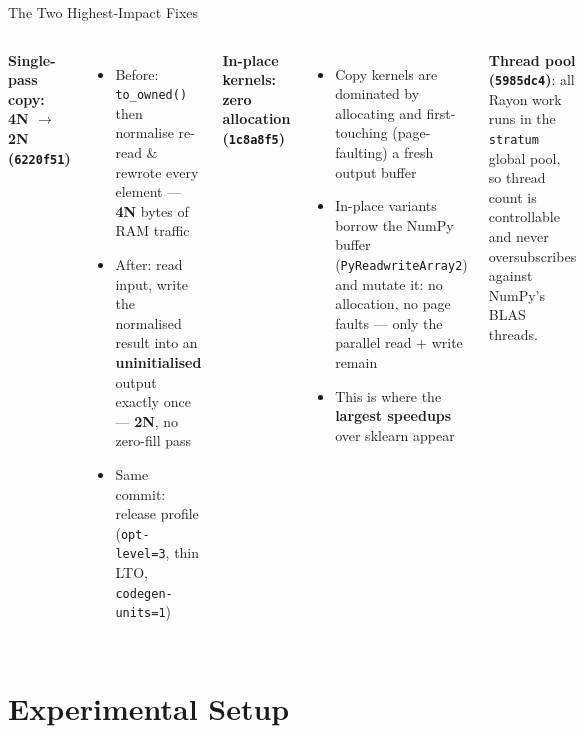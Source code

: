 \documentclass[aspectratio=169]{beamer}
\begin{document}
\begin{frame}{The Two Highest-Impact Fixes}
  \begin{columns}[T]
    \textbf{Single-pass copy: 4N $\rightarrow$ 2N (\texttt{6220f51})}
    \begin{itemize}
      \item Before: \texttt{to\_owned()} then normalise re-read \& rewrote every
            element --- \textbf{4N} bytes of RAM traffic
      \item After: read input, write the normalised result into an
            \textbf{uninitialised} output exactly once --- \textbf{2N}, no
            zero-fill pass
      \item Same commit: release profile
            (\texttt{opt-level=3}, thin LTO, \texttt{codegen-units=1})
    \end{itemize}
    \textbf{In-place kernels: zero allocation (\texttt{1c8a8f5})}
    \begin{itemize}
      \item Copy kernels are dominated by allocating and first-touching
            (page-faulting) a fresh output buffer
      \item In-place variants borrow the NumPy buffer
            (\texttt{PyReadwriteArray2}) and mutate it: no allocation, no page
            faults --- only the parallel read + write remain
      \item This is where the \textbf{largest speedups} over sklearn appear
    \end{itemize}
    \vspace{0.3em}
    \textbf{Thread pool (\texttt{5985dc4})}: all Rayon work runs in the
    \texttt{stratum} global pool, so thread count is controllable and never
    oversubscribes against NumPy's BLAS threads.
  \end{columns}
\end{frame}

\section{Experimental Setup}
\end{document}
